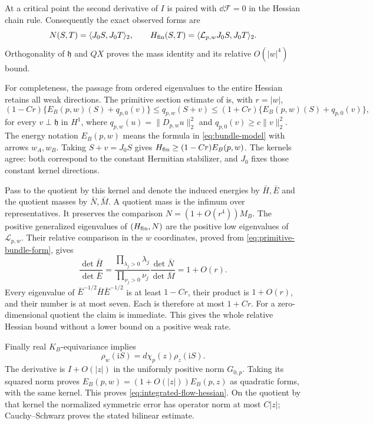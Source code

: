 At a critical point the second derivative of $I$ is
paired with $\dd\mathcal F=0$ in the Hessian chain rule.
Consequently the exact observed forms are
\begin{equation}\label{eq:observed-graph-forms}
 N(S,T)=\langle J_0S,J_0T\rangle_2,\qquad
 H_{\rm fin}(S,T)=
              \langle\mathcal L_{p,w}J_0S,J_0T\rangle_2.
\end{equation}
Orthogonality of $\mathfrak h$ and $QX$ proves the mass
identity and its relative $O(|w|^4)$ bound.

For completeness, the passage from ordered eigenvalues
to the entire Hessian retains all weak directions.
The primitive section estimate of
\cite[Section~6]{W_HYM} is, with $r=|w|$,
\begin{equation}\label{eq:primitive-bundle-form}
 (1-Cr)\{E_B(p,w)(S)+q_{p,0}(v)\}
 \le q_{p,w}(S+v)
 \le(1+Cr)\{E_B(p,w)(S)+q_{p,0}(v)\},
\end{equation}
for every $v\perp\mathfrak h$ in $H^1$, where
$q_{p,w}(u)=\|D_{p,w}u\|_2^2$ and
$q_{p,0}(v)\ge c\|v\|_2^2$. The energy notation
$E_B(p,w)$ means the formula in \eqref{eq:bundle-model}
with arrows $w_A,w_B$.
Taking $S+v=J_0S$ gives
$H_{\rm fin}\ge(1-Cr)E_B(p,w)$.
The kernels agree: both correspond to the constant
Hermitian stabilizer, and $J_0$ fixes those constant
kernel directions.

Pass to the quotient by this kernel and denote the
induced energies by $\bar H,\bar E$ and the quotient
masses by $\bar N,\bar M$. A quotient mass is the
infimum over representatives. It preserves the comparison
$N=(1+O(r^4))M_B$.
The positive generalized eigenvalues of $(H_{\rm fin},N)$
are the positive low eigenvalues of $\mathcal L_{p,w}$.
Their relative comparison in the $w$ coordinates,
proved from \eqref{eq:primitive-bundle-form}, gives
\[
 \frac{\det\bar H}{\det\bar E}
  =\frac{\prod_{\lambda_j>0}\lambda_j}
          {\prod_{\nu_j>0}\nu_j}
       \frac{\det\bar N}{\det\bar M}
  =1+O(r).
\]
Every eigenvalue of $\bar E^{-1/2}\bar H\bar E^{-1/2}$
is at least $1-Cr$, their product is $1+O(r)$,
and their number is at most seven. Each is therefore
at most $1+Cr$. For a zero-dimensional quotient the
claim is immediate. This gives the whole relative
Hessian bound without a lower bound on a positive
weak rate.

Finally real $K_B$-equivariance implies
\[
 \rho_w(\mathrm iS)=d\chi_p(z)\rho_z(\mathrm iS).
\]
The derivative is $I+O(|z|)$ in the uniformly positive
norm $G_{0,p}$. Taking its squared norm proves
$E_B(p,w)=(1+O(|z|))E_B(p,z)$ as quadratic forms,
with the same kernel. This proves
\eqref{eq:integrated-flow-hessian}. On the quotient by that
kernel the normalized symmetric error has operator
norm at most $C|z|$; Cauchy--Schwarz proves the stated
bilinear estimate.

